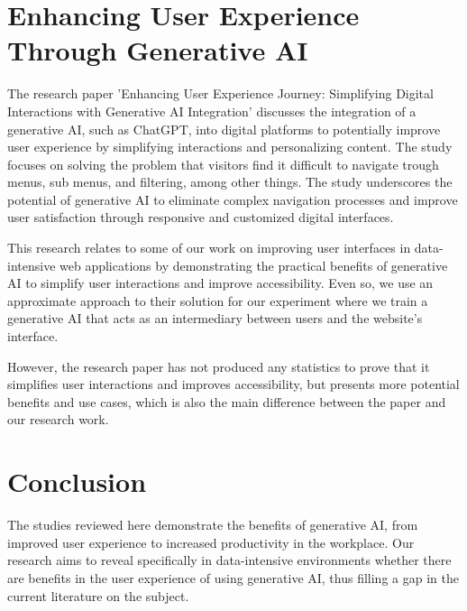 \section{Enhancing User Experience Through Generative AI}
The research paper 'Enhancing User Experience Journey: Simplifying Digital Interactions with Generative AI Integration' \cite{resGateGenAI} discusses the integration of a generative AI, such as ChatGPT, into digital platforms to potentially improve user experience by simplifying interactions and personalizing content. The study focuses on solving the problem that visitors find it difficult to navigate trough menus, sub menus, and filtering, among other things. The study underscores the potential of generative AI to eliminate complex navigation processes and improve user satisfaction through responsive and customized digital interfaces.

This research relates to some of our work on improving user interfaces in data-intensive web applications by demonstrating the practical benefits of generative AI to simplify user interactions and improve accessibility. Even so, we use an approximate approach to their solution for our experiment where we train a generative AI that acts as an intermediary between users and the website's interface.

However, the research paper has not produced any statistics to prove that it simplifies user interactions and improves accessibility, but presents more potential benefits and use cases, which is also the main difference between the paper and our research work.

\section{Conclusion}
The studies reviewed here demonstrate the benefits of generative AI, from improved user experience to increased productivity in the workplace. Our research aims to reveal specifically in data-intensive environments whether there are benefits in the user experience of using generative AI, thus filling a gap in the current literature on the subject.
